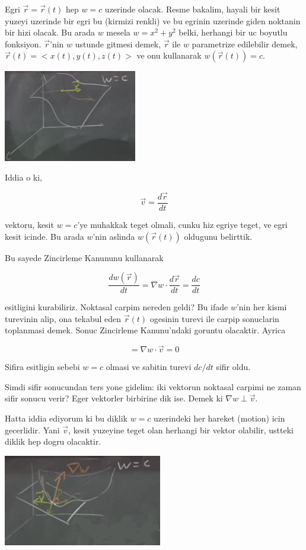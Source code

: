 \documentclass[12pt,fleqn]{article}
\begin{document}
Egri $\vec{r} = \vec{r}(t)$ hep $w = c$ uzerinde olacak. Resme bakalim,
hayali bir kesit yuzeyi uzerinde bir egri bu (kirmizi renkli) ve bu egrinin
uzerinde giden noktanin bir hizi olacak. Bu arada $w$ mesela $w = x^2 +
y^2$ belki,
herhangi bir uc boyutlu fonksiyon. $\vec{r}$'nin $w$ ustunde gitmesi demek, $\vec{r}$ ile 
$w$ parametrize edilebilir demek, $\vec{r}(t)
= <x(t),y(t),z(t)>$ ve onu 
kullanarak $w(\vec{r}(t)) = c$.

\includegraphics[height=4cm]{12_3.png}

Iddia o ki, 

\[ \vec{v} = \frac{d\vec{r}}{dt} \]

vektoru, kesit $w = c$'ye muhakkak teget olmali, cunku hiz egriye teget, ve
egri kesit icinde. Bu arada $w$'nin aslinda $w(\vec{r}(t))$ oldugunu
belirttik.

Bu sayede Zincirleme Kanununu kullanarak 

\[ \frac{dw(\vec{r})}{dt} = \nabla w \cdot \frac{d\vec{r}}{dt} = \frac{dc}{dt}\]

esitligini kurabiliriz. Noktasal carpim nereden geldi? Bu ifade $w$'nin
her kismi turevinin alip, ona tekabul eden $\vec{r}(t)$ ogesinin turevi ile
carpip sonuclarin toplanmasi demek. Sonuc Zincirleme Kanunu'ndaki goruntu
olacaktir. Ayrica

\[  = \nabla w \cdot \vec{v} = 0\]

Sifira esitligin sebebi $w = c$ olmasi ve sabitin turevi $dc/dt$ sifir oldu. 

Simdi sifir sonucundan ters yone gidelim: iki vektorun noktasal carpimi ne
zaman sifir sonucu verir? Eger vektorler birbirine dik ise. Demek ki
$\nabla w \perp \vec{v}$.

Hatta iddia ediyorum ki bu diklik $w=c$ uzerindeki her hareket (motion)
icin gecerlidir. Yani $\vec{v}$, kesit yuzeyine teget olan herhangi bir
vektor olabilir, ustteki diklik hep dogru olacaktir.

\includegraphics[height=4cm]{12_4.png}
\end{document}
